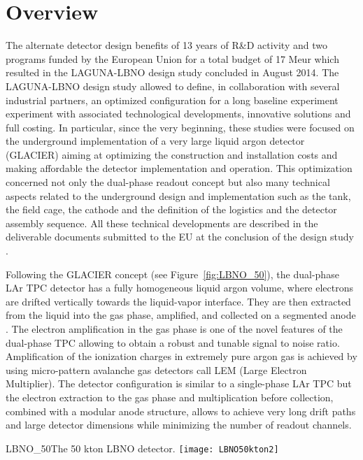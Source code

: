 \section{Overview}
\label{sec:detectors-fd-ref-ov}

The alternate detector design benefits of 13 years of R\&D activity and two programs funded by the European Union for a total budget of 17 Meur which resulted in the LAGUNA-LBNO design study concluded in August 2014. The LAGUNA-LBNO design study allowed to define, in collaboration with several industrial partners, an optimized configuration for a long baseline experiment  experiment with associated technological developments, innovative solutions and full costing. In particular, since the very beginning, these studies were focused on the underground implementation of a very large liquid argon detector (GLACIER) aiming at optimizing the construction and installation costs and making affordable the detector implementation and operation. This optimization concerned not only the dual-phase readout concept but also many technical aspects related to the underground design and implementation such as the tank, the field cage, the cathode  and the definition of the logistics and the detector assembly sequence. All these technical developments are described in the deliverable documents submitted to the EU at the conclusion of the design study \cite{LAGUNA-LBNO-deliv}.

Following the GLACIER concept (see Figure~\ref{fig:LBNO_50}), the dual-phase LAr TPC detector has a fully homogeneous liquid argon volume, where electrons are drifted vertically towards the liquid-vapor interface. They are then extracted from the liquid into the gas phase, amplified, and collected on a segmented anode \cite{Badertscher:2013wm,Badertscher:2012dq,Badertscher:2010zg}. The electron amplification in the gas phase is one of the novel features of the dual-phase TPC  allowing to obtain a robust and tunable signal to noise ratio. Amplification of the ionization charges in extremely pure argon gas is achieved by using micro-pattern avalanche gas detectors call LEM (Large Electron Multiplier). The detector configuration is similar to a single-phase LAr TPC but the electron extraction to the gas phase and multiplication before collection, combined with a modular anode structure, allows to achieve very long drift paths and  large detector dimensions while minimizing the number of readout channels.

\begin{cdrfigure}{LBNO_50}{The 50 kton LBNO detector.}
\texttt{[image: LBNO50kton2]}
\end{cdrfigure}

